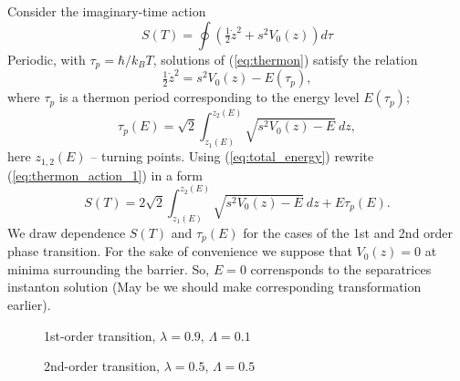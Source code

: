 \documentclass[aps, pre, preprint, groupedaddress, superscriptaddress, showkeys, showpacs] {revtex4-1}
\begin{document}
Consider the imaginary-time action
%
\begin{equation}
S(T) = \oint (\tfrac{1}{2} \dot{z}^2 + s^2 V_0(z)) d \tau
\label{eq:thermon_action_1}
\end{equation}
%
Periodic, with $\tau_p = \hbar / k_B T$, solutions of (\ref{eq:thermon}) satisfy the relation
%
\begin{equation}
\tfrac{1}{2} \dot{z}^2 = s^2 V_0(z) - E(\tau_p),
\label{eq:total_energy}
\end{equation}
%
where $\tau_p$ is a thermon period corresponding to the energy level $E(\tau_p)$;
%
\begin{equation}
\tau_p(E) = \sqrt{2} \int_{z_1(E)}^{z_2(E)} \sqrt{s^2 V_0(z) - E} ~dz,
\label{eq:thermon_period}
\end{equation}
%
here $z_{1,2}(E)$ -- turning points.
Using (\ref{eq:total_energy}) rewrite (\ref{eq:thermon_action_1}) in a form 
%
\begin{equation}
S(T) = 2\sqrt{2} \int_{z_1(E)}^{z_2(E)} \sqrt{s^2 V_0(z) - E} ~dz + E \tau_p (E).
\label{eq:thermon_action_2}
\end{equation}
%
We draw dependence $S(T)$ and $\tau_p(E)$ for the cases of the 1st and 2nd order phase transition.
For the sake of convenience we suppose that $V_0(z) = 0$ at minima surrounding the barrier.
So, $E = 0$ corrensponds to the separatrices instanton solution (May be we should make corresponding transformation earlier).
%
\begin{figure}[ht]
\caption{1st-order transition, $\lambda = 0.9$, $\Lambda = 0.1$}
\end{figure}
%
\begin{figure}[ht]
\caption{2nd-order transition, $\lambda = 0.5$, $\Lambda = 0.5$}
\end{figure}
%
\end{document}
